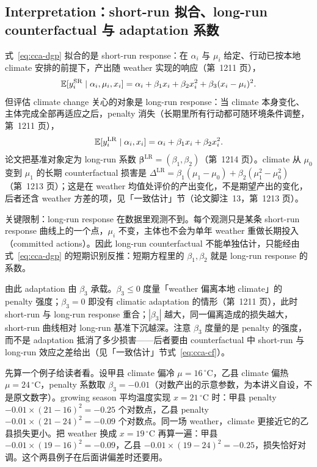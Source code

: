 \subsection{Interpretation：short-run 拟合、long-run counterfactual 与 adaptation 系数}

式~\ref{eq:cca-dgp} 拟合的是 short-run response：在 $\alpha_i$ 与 $\mu_i$ 给定、行动已按本地 climate 安排的前提下，产出随 weather 实现的响应（第~1211 页），
\begin{equation}
\mathbb{E}[y_{i}^{\mathrm{SR}} \mid \alpha_i, \mu_i, x_i] = \alpha_i + \beta_1 x_i + \beta_2 x_i^2 + \beta_3 (x_i-\mu_i)^2 .
\label{eq:cca-sr}
\end{equation}
但评估 climate change 关心的对象是 long-run response：当 climate 本身变化、主体完成全部再适应之后，penalty 消失（长期里所有行动都可随环境条件调整，第~1211 页），
\begin{equation}
\mathbb{E}[y_{i}^{\mathrm{LR}} \mid \alpha_i, x_i] = \alpha_i + \beta_1 x_i + \beta_2 x_i^2 .
\label{eq:cca-lr}
\end{equation}
论文把基准对象定为 long-run 系数 $\boldsymbol{\beta}^{\mathrm{LR}}=(\beta_1,\beta_2)$（第~1214 页）。climate 从 $\mu_0$ 变到 $\mu_1$ 的长期 counterfactual 损害是 $\Delta^{\mathrm{LR}}=\beta_1(\mu_1-\mu_0)+\beta_2(\mu_1^2-\mu_0^2)$（第~1213 页）；这是在 weather 均值处评价的产出变化，不是期望产出的变化，后者还含 weather 方差的项，见「一致估计」节（论文脚注~13，第~1213 页）。

关键限制：long-run response 在数据里观测不到。每个观测只是某条 short-run response 曲线上的一个点，$\mu_i$ 不变，主体也不会为单年 weather 重做长期投入（committed actions）。因此 long-run counterfactual 不能单独估计，只能经由式~\ref{eq:cca-dgp} 的短期识别反推：短期方程里的 $\beta_1,\beta_2$ 就是 long-run response 的系数。

由此 adaptation 由 $\beta_3$ 承载。$\beta_3\le 0$ 度量「weather 偏离本地 climate」的 penalty 强度；$\beta_3=0$ 即没有 climatic adaptation 的情形（第~1211 页），此时 short-run 与 long-run response 重合；$|\beta_3|$ 越大，同一偏离造成的损失越大，short-run 曲线相对 long-run 基准下沉越深。注意 $\beta_3$ 度量的是 penalty 的强度，而不是 adaptation 抵消了多少损害——后者要由 counterfactual 中 short-run 与 long-run 效应之差给出（见「一致估计」节式~\ref{eq:cca-cf}）。

先算一个例子给读者看。设甲县 climate 偏冷 $\mu=16\,^\circ$C，乙县 climate 偏热 $\mu=24\,^\circ$C，penalty 系数取 $\beta_3=-0.01$（对数产出的示意参数，为本讲义自设，不是原文数字）。growing season 平均温度实现 $x=21\,^\circ$C 时：甲县 penalty $-0.01\times(21-16)^2=-0.25$ 个对数点，乙县 penalty $-0.01\times(21-24)^2=-0.09$ 个对数点。同一场 weather，climate 更接近它的乙县损失更小。把 weather 换成 $x=19\,^\circ$C 再算一遍：甲县 $-0.01\times(19-16)^2=-0.09$，乙县 $-0.01\times(19-24)^2=-0.25$，损失恰好对调。这个两县例子在后面讲偏差时还要用。

